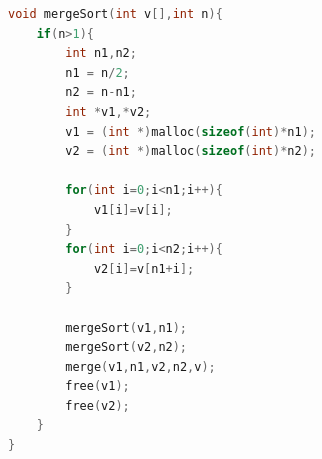 \begin{lstlisting}[language=C]
void mergeSort(int v[],int n){
    if(n>1){
        int n1,n2;
        n1 = n/2;
        n2 = n-n1;
        int *v1,*v2;
        v1 = (int *)malloc(sizeof(int)*n1);
        v2 = (int *)malloc(sizeof(int)*n2);

        for(int i=0;i<n1;i++){
            v1[i]=v[i];
        }
        for(int i=0;i<n2;i++){
            v2[i]=v[n1+i];
        }

        mergeSort(v1,n1);
        mergeSort(v2,n2);
        merge(v1,n1,v2,n2,v);
        free(v1);
        free(v2);
    }
}
\end{lstlisting}


